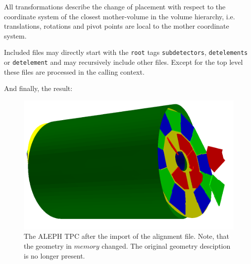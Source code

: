 \documentclass[10pt,a4paper]{article}
\begin{document}
\noindent
All transformations describe the change of placement with respect to the 
coordinate system of the closest mother-volume in the volume hierarchy,
i.e. translations, rotations and pivot points are local to the 
mother coordinate system.

\newpage
\noindent
Included files may directly start with the {\tt root} tags {\tt subdetectors}, 
{\tt detelements} or {\tt detelement} and may recursively include other
files. Except for the top level these files are processed in the calling context.

\vspace{1cm}
\noindent
And finally, the result:
\begin{figure}[h]
  \begin{center}
    \includegraphics[width=160mm] {DDAlign-misaligned-TPC}
    \caption{The ALEPH TPC after the import of the alignment file.
    Note, that the geometry in $memory$ changed. The original
    geometry desciption is no longer present.
    }
    \label{fig:dd4hep-aligned-hierarchies}
  \end{center}
\end{figure}


\noindent
\end{document}
